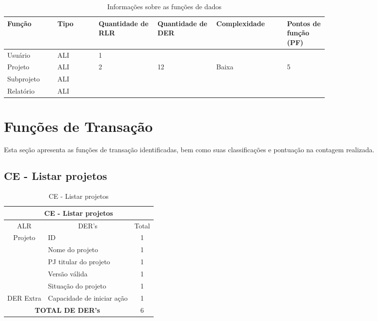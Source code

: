       \begin{table*}[!h]
      \centering
      \caption{Informações sobre as funções de dados}
      \label{funcoes_dados}
	\begin{tabular}{|p{0.12\linewidth}|p{0.10\linewidth}|p{0.14\linewidth}|p{0.14\linewidth}|p{0.17\linewidth}|p{0.10\linewidth}|}
	\hline
	\textbf{Função} & \textbf{Tipo} & \textbf{Quantidade de RLR} & \textbf{Quantidade de DER} & \textbf{Complexidade} & \textbf{Pontos de função (PF)} \\
	  \hline
	Usuário & ALI & 1 &  &  & \\
	\hline
	Projeto & ALI & 2 & 12 & Baixa & 5 \\
	\hline
	Subprojeto & ALI & &  & & \\
	\hline
	Relatório & ALI & &  & & \\
	\hline
	\end{tabular}
      \end{table*}

\vfill
\pagebreak
\section{Funções de Transação}
  
  Esta seção apresenta as funções de transação identificadas, bem como suas classificações e pontuação na contagem realizada.
  
  \subsection{CE - Listar projetos}

\begin{table}[!h]
\centering
\caption{CE - Listar projetos}
\label{ce_listar_projeto}
\begin{tabular}{|c|l|c|}
\hline
\multicolumn{3}{|c|}{CE - Listar projetos}                    \\ \hline
ALR                      & \multicolumn{1}{c|}{DER's} & Total \\ \hline
\multirow{5}{*}{Projeto} & ID                         & 1     \\ \cline{2-3} 
                         & Nome do projeto            & 1     \\ \cline{2-3} 
                         & PJ titular do projeto      & 1     \\ \cline{2-3} 
                         & Versão válida              & 1     \\ \cline{2-3} 
                         & Situação do projeto        & 1     \\ \hline
DER Extra                & Capacidade de iniciar ação & 1     \\ \hline
\multicolumn{2}{|c|}{\textbf{TOTAL DE DER's}}                  & 6     \\ \hline
\end{tabular}
\end{table}

